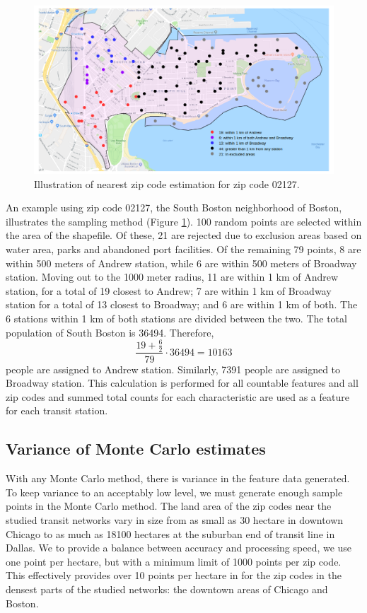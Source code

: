 \documentclass[11pt]{article}
\begin{document}
\begin{figure}
\begin{center}\includegraphics[scale=0.55]{geo_point_demonstration}\end{center}\caption{Illustration of nearest zip code estimation for zip code 02127.}\label{fig:f1}
\end{figure}


An example using zip code 02127, the South Boston neighborhood of Boston, illustrates the sampling method (Figure \ref{fig:f1}). 100 random points are selected within the area of the shapefile. Of these, 21 are rejected due to exclusion areas based on water area, parks and abandoned port facilities. Of the remaining 79 points, 8 are within 500 meters of Andrew station, while 6 are within 500 meters of Broadway station. Moving out to the 1000 meter radius, 11 are within 1 km of Andrew station, for a total of 19 closest to Andrew; 7 are within 1 km of Broadway station for a total of 13 closest to Broadway; and 6 are within 1 km of both. The 6 stations within 1 km of both stations are divided between the two. The total population of South Boston is 36494. Therefore, $$\frac{19 + \frac{6}{2}}{79}\cdot{36494} = 10163$$ people are assigned to Andrew station. Similarly, 7391 people are assigned to Broadway station. This calculation is performed for all countable features and all zip codes and summed total counts for each characteristic are used as a feature for each transit station. 

\subsection{Variance of Monte Carlo estimates}

With any Monte Carlo method, there is variance in the feature data generated. To keep variance to an acceptably low level, we must generate enough sample points in the Monte Carlo method.  The land area of the zip codes near the studied transit networks vary in size from as small as 30 hectare in downtown Chicago to as much as 18100 hectares at the suburban end of transit line in Dallas. We to provide a balance between accuracy and processing speed, we use one point per hectare, but with a minimum limit of 1000 points per zip code. This effectively provides over 10 points per hectare in for the zip codes in the densest parts of the studied networks: the downtown areas of Chicago and Boston. 
\end{document}
